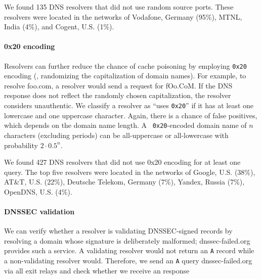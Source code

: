 We found 135 DNS resolvers that did not use random source ports.  These
resolvers were located in the networks of Vodafone, Germany (95\%), MTNL, India
(4\%), and Cogent, U.S. (1\%).

\paragraph{0x20 encoding}
Resolvers can further reduce the chance of cache poisoning by employing
{\tt 0x20} encoding (\ie, randomizing the capitalization of domain
names).  For example, to resolve foo.com, a resolver would send a
request for fOo.CoM.  If the DNS response does not reflect the
randomly chosen capitalization, the resolver considers unauthentic.  We
classify a resolver as ``uses {\tt 0x20}'' if it has at least one
lowercase and one uppercase character.  Again, there is a chance of
false positives, which depends on the domain name length.  A {\tt
  0x20}-encoded domain name of $n$ characters (excluding periods) can be
all-uppercase or all-lowercase with probability $2 \cdot 0.5^n$.

We found 427 DNS resolvers that did not use 0x20 encoding for at least one
query.  The top five resolvers were located in the networks of Google, U.S.
(38\%), AT\&T, U.S. (22\%), Deutsche Telekom, Germany (7\%), Yandex, Russia
(7\%), OpenDNS, U.S. (4\%).

\paragraph{DNSSEC validation}
We can verify whether a resolver is validating DNSSEC-signed records by resolving a
domain whose signature is deliberately malformed; 
dnssec-failed.org provides such a service.  A validating resolver
would not return an {\tt A} record while
a non-validating resolver would.  Therefore, we send an {\tt A} query dnssec-failed.org via
all exit relays and check whether we receive an response
\fi
